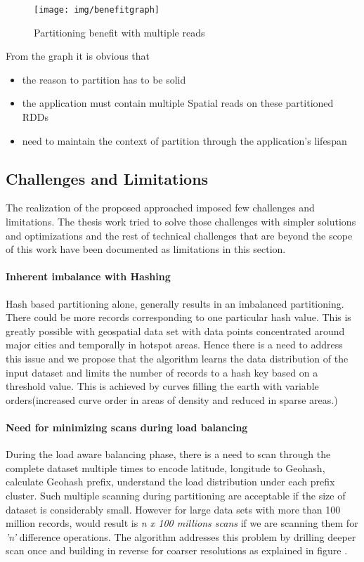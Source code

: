 \documentclass[article,type=msc,colorback,12pt,accentcolor=tud1d]{tudthesis}
\begin{document}
				\begin{figure}[h]
				\centering
				\texttt{[image: img/benefitgraph]}
				\caption{Partitioning benefit with multiple reads}
				\label{fig:benefitgraph}
				\end{figure}
			
			From the graph it is obvious that 
			\begin{itemize}
				\item the reason to partition has to be solid 
				\item the application must contain multiple Spatial reads on these partitioned RDDs
				\item need to maintain the context of partition through the application's lifespan
			\end{itemize}
						  
		  \clearpage
		  \subsection{Challenges and Limitations}
		  
		  The realization of the proposed approached imposed few challenges and limitations. The thesis work tried to solve those challenges with simpler solutions and optimizations and the rest of technical challenges that are beyond the scope of this work have been documented as limitations in this section.
		  
		  \paragraph{Inherent imbalance with Hashing}
			  Hash based partitioning alone, generally results in an imbalanced partitioning. There could be more records corresponding to one particular hash value. This is greatly possible with geospatial data set with data points concentrated around major cities and temporally in hotspot areas. Hence there is a need to address this issue and we propose that the algorithm learns the data distribution of the input dataset and limits the number of records to a hash key based on a threshold value. This is achieved by curves filling the earth with variable orders(increased curve order in areas of density and reduced in sparse areas.)
			  
		  \paragraph{Need for minimizing scans during load balancing}
			  During the load aware balancing phase, there is a need to scan through the complete dataset multiple times to encode latitude, longitude to Geohash, calculate Geohash prefix, understand the load distribution under each prefix cluster. Such multiple scanning during partitioning are acceptable if the size of dataset is considerably small. However for large data sets with more than 100 million records, would result is \textit{n x 100 millions scans} if we are scanning them for \textit{'n'} difference operations. The algorithm addresses this problem by drilling deeper scan once and building in reverse for coarser resolutions as explained in figure \pageref{fig:loadlevels}. 
			  
\end{document}
